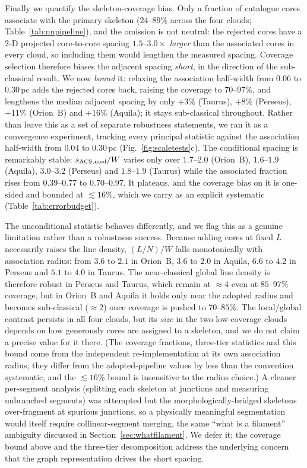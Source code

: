 \documentclass[usenatbib,twoside,twocolumn]{mnras}
\begin{document}
Finally we quantify the skeleton-coverage bias. Only a fraction of catalogue cores associate with the primary skeleton ($24$--$89\%$ across the four clouds; Table~\ref{tab:nnpipeline}), and the omission is not neutral: the rejected cores have a $2$-D projected core-to-core spacing $1.5$--$3.0\times$ \emph{larger} than the associated cores in every cloud, so including them would lengthen the measured spacing. Coverage selection therefore biases the adjacent spacing \emph{short}, in the direction of the sub-classical result. We now \emph{bound} it: relaxing the association half-width from $0.06$ to $0.30$\,pc adds the rejected cores back, raising the coverage to $70$--$97\%$, and lengthens the median adjacent spacing by only $+3\%$ (Taurus), $+8\%$ (Perseus), $+11\%$ (Orion~B) and $+16\%$ (Aquila); it stays sub-classical throughout. Rather than leave this as a set of separate robustness statements, we ran it as a convergence experiment, tracking every principal statistic against the association half-width from $0.04$ to $0.30$\,pc (Fig.~\ref{fig:scaletests}c). The conditional spacing is remarkably stable: $s_{\rm ACS,med}/W$ varies only over $1.7$--$2.0$ (Orion~B), $1.6$--$1.9$ (Aquila), $3.0$--$3.2$ (Perseus) and $1.8$--$1.9$ (Taurus) while the associated fraction rises from $0.39$--$0.77$ to $0.70$--$0.97$. It plateaus, and the coverage bias on it is one-sided and bounded at $\lesssim16\%$, which we carry as an explicit systematic (Table~\ref{tab:errorbudget}).

The unconditional statistic behaves differently, and we flag this as a genuine limitation rather than a robustness success. Because adding cores at fixed $L$ necessarily raises the line density, $(L/N)/W$ falls monotonically with association radius: from $3.6$ to $2.1$ in Orion~B, $3.6$ to $2.0$ in Aquila, $6.6$ to $4.2$ in Perseus and $5.1$ to $4.0$ in Taurus. The near-classical global line density is therefore robust in Perseus and Taurus, which remain at $\approx4$ even at $85$--$97\%$ coverage, but in Orion~B and Aquila it holds only near the adopted radius and becomes sub-classical ($\approx2$) once coverage is pushed to $70$--$85\%$. The local/global contrast persists in all four clouds, but its \emph{size} in the two low-coverage clouds depends on how generously cores are assigned to a skeleton, and we do not claim a precise value for it there. (The coverage fractions, three-tier statistics and this bound come from the independent re-implementation at its own association radius; they differ from the adopted-pipeline values by less than the convention systematic, and the $\lesssim16\%$ bound is insensitive to the radius choice.) A cleaner per-segment analysis (splitting each skeleton at junctions and measuring unbranched segments) was attempted but the morphologically-bridged skeletons over-fragment at spurious junctions, so a physically meaningful segmentation would itself require collinear-segment merging, the same ``what is a filament'' ambiguity discussed in Section~\ref{sec:whatfilament}. We defer it; the coverage bound above and the three-tier decomposition address the underlying concern that the graph representation drives the short spacing.
\end{document}
